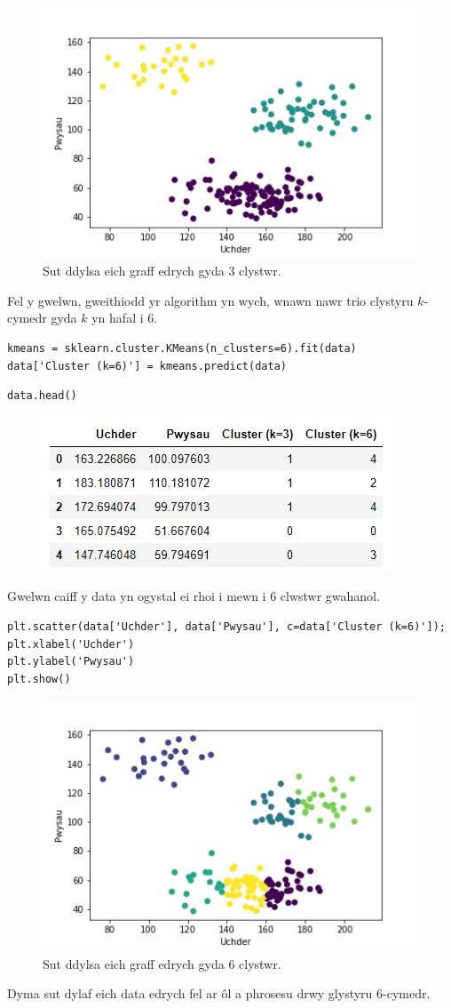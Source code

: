 \begin{figure}[H]
\begin{center}
\includegraphics[width=0.7\linewidth]{../img/3clystwrpython.jpeg}
\caption{Sut ddylsa eich graff edrych gyda 3 clystwr.}
\label{fig:3clystwrpython}
\end{center}
\end{figure}

Fel y gwelwn, gweithiodd yr algorithm yn wych, wnawn nawr trio clystyru $k$-cymedr gyda $k$ yn hafal i 6.

\begin{verbatim}
kmeans = sklearn.cluster.KMeans(n_clusters=6).fit(data)
data['Cluster (k=6)'] = kmeans.predict(data)
\end{verbatim}

\begin{verbatim}
data.head()
\end{verbatim}

\begin{figure}[H]
\includegraphics[width=0.35\linewidth]{../img/tabl3.jpg}
\label{fig:Data3}
\end{figure}

Gwelwn caiff y data yn ogystal ei rhoi i mewn i 6 clwstwr gwahanol. 

\begin{verbatim}
plt.scatter(data['Uchder'], data['Pwysau'], c=data['Cluster (k=6)']);
plt.xlabel('Uchder')
plt.ylabel('Pwysau')
plt.show()
\end{verbatim}

\begin{figure}[H]
\begin{center}
\includegraphics[width=0.7\linewidth]{../img/6clystwrpython.jpeg}
\caption{Sut ddylsa eich graff edrych gyda 6 clystwr.}
\label{fig:6clystwrpython}
\end{center}
\end{figure}

Dyma sut dylaf eich data edrych fel ar \^{o}l a phrosesu drwy glystyru 6-cymedr. 